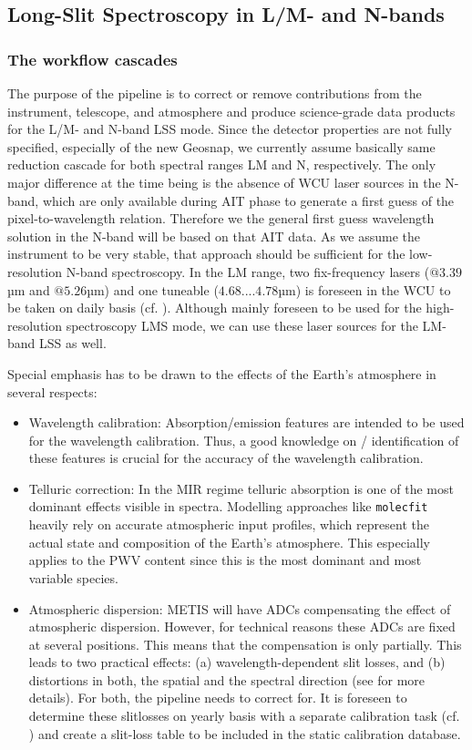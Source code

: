 \subsection{Long-Slit Spectroscopy in L/M- and N-bands}\label{lss:overview}
\subsubsection{The workflow cascades}\label{lss:cascade_overview}
The purpose of the pipeline is to correct or remove contributions from
the instrument, telescope, and atmosphere and produce science-grade
data products for the L/M- and N-band \ac{LSS}
mode. Since the detector properties are not fully specified, especially of the new Geosnap, we currently assume
basically same reduction cascade for both spectral ranges LM and
N, respectively. The only major difference at the time being is the absence of \ac{WCU} laser sources in the N-band, which are only available during \ac{AIT} phase to generate a first guess of the pixel-to-wavelength relation. Therefore we the general first guess wavelength solution in the N-band will be based on that \ac{AIT} data. As we assume the instrument to be very stable, that approach should be sufficient for the low-resolution N-band spectroscopy. In the LM range, two fix-frequency lasers ($@3.39$µm and $@5.26$µm) and one tuneable ($4.68....4.78$µm) is foreseen in the \ac{WCU} to be taken on daily basis (cf. \cite{METIS-calibration_plan}). Although mainly foreseen to be used for the high-resolution spectroscopy \ac{LMS} mode, we can use these laser sources for the LM-band \ac{LSS} as well.

Special emphasis has to be drawn to the effects of the Earth's
atmosphere in several respects:
\begin{itemize}
\item Wavelength calibration: Absorption/emission features are intended to be
  used for the wavelength calibration. Thus, a good knowledge on /
  identification of these features is crucial for the accuracy of the
  wavelength calibration.
\item Telluric correction: In the MIR regime telluric absorption is
  one of the most dominant effects visible in spectra. Modelling
  approaches like \texttt{molecfit} heavily rely on accurate
  atmospheric input profiles, which represent the actual state and
  composition of the Earth's atmosphere. This especially applies to
  the \ac{PWV} content since this is the most
  dominant and most variable species.
\item Atmospheric dispersion: \ac{METIS} will have \ac{ADC}s compensating the
  effect of atmospheric dispersion. However, for technical reasons
  these ADCs are fixed at several positions. This means that the
  compensation is only partially. This leads to two practical effects:
  (a) wavelength-dependent slit losses, and (b) distortions in both,
  the spatial and the spectral direction (see \cite{METIS-ADC_study}
  for more details). For both, the pipeline needs to correct
  for. It is foreseen to determine these slitlosses on yearly basis with a separate calibration task (cf. \cite{METIS-calibration_plan}) and create a slit-loss table to be included in the static calibration database.
\end{itemize}

